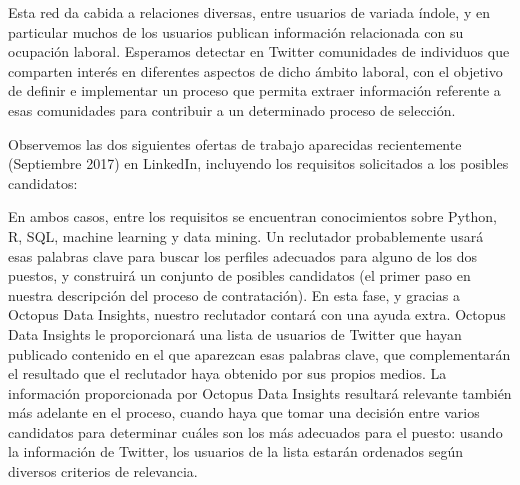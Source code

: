 

Esta red da cabida a relaciones diversas, entre usuarios de variada índole, y en particular
muchos de los usuarios  publican información relacionada con su ocupación laboral. Esperamos
detectar en Twitter comunidades de individuos que comparten interés en diferentes 
aspectos de dicho ámbito laboral, con el objetivo de definir e 
implementar un proceso que permita extraer información referente a 
esas comunidades para contribuir a un determinado proceso de selección.

Observemos las dos siguientes ofertas de trabajo aparecidas recientemente (Septiembre 2017) en LinkedIn,
incluyendo los requisitos solicitados a los posibles candidatos:




En ambos casos, entre los requisitos se encuentran conocimientos sobre Python, R,
SQL, machine learning y data mining. Un reclutador probablemente usará esas palabras clave para buscar
los perfiles adecuados para alguno de los dos puestos, y construirá un conjunto de posibles candidatos (el
primer paso en nuestra descripción del proceso de contratación). En esta fase, y gracias a Octopus Data Insights,
nuestro reclutador contará con una ayuda extra. Octopus Data Insights le proporcionará una lista de usuarios
de Twitter que hayan publicado contenido en el que aparezcan esas palabras clave, que complementarán
el resultado que el reclutador haya obtenido por sus propios medios. La información proporcionada
por Octopus Data Insights resultará relevante también más adelante en el proceso,
cuando haya que tomar una decisión entre varios candidatos para determinar cuáles son los más adecuados para el 
puesto: usando la información de Twitter, los usuarios de la lista estarán ordenados según 
diversos criterios de relevancia.

